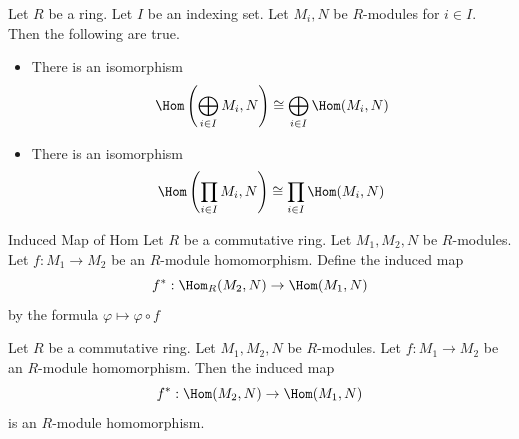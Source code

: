 \documentclass[a4paper]{article}
\begin{document}
\begin{prp}{}{} Let $R$ be a ring. Let $I$ be an indexing set. Let $M_i,N$ be $R$-modules for $i\in I$. Then the following are true. 
\begin{itemize}
\item There is an isomorphism $$\Hom\left(\bigoplus_{i\in I}M_i,N\right)\cong\bigoplus_{i\in I}\Hom(M_i,N)$$
\item There is an isomorphism $$\Hom\left(\prod_{i\in I}M_i,N\right)\cong\prod_{i\in I}\Hom(M_i,N)$$
\end{itemize} 
\end{prp}

\begin{defn}{Induced Map of Hom}{} Let $R$ be a commutative ring. Let $M_1,M_2,N$ be $R$-modules. Let $f:M_1\to M_2$ be an $R$-module homomorphism. Define the induced map $$f^\ast:\Hom_R(M_2,N)\to\Hom(M_1,N)$$ by the formula $\varphi\mapsto\varphi\circ f$
\end{defn}

\begin{lmm}{}{} Let $R$ be a commutative ring. Let $M_1,M_2,N$ be $R$-modules. Let $f:M_1\to M_2$ be an $R$-module homomorphism. Then the induced map $$f^\ast:\Hom(M_2,N)\to\Hom(M_1,N)$$ is an $R$-module homomorphism. 
\end{lmm}
\end{document}
